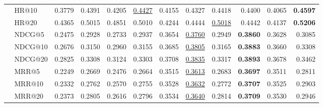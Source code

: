 \begin{tabular}{llrrrrrrrrrr}
 & HR@10 & 0.3779 & 0.4391 & 0.4205 & \underline{0.4427} & 0.4155 & 0.4327 & 0.4418 & 0.4400 & 0.4065 & \textbf{0.4597} \\
 & HR@20 & 0.4365 & 0.5015 & 0.4851 & 0.5010 & 0.4244 & 0.4444 & \underline{0.5018} & 0.4442 & 0.4137 & \textbf{0.5206} \\
 & NDCG@5 & 0.2475 & 0.2928 & 0.2733 & 0.2937 & 0.3654 & \underline{0.3760} & 0.2949 & \textbf{0.3860} & 0.3628 & 0.3085 \\
 & NDCG@10 & 0.2676 & 0.3150 & 0.2960 & 0.3155 & 0.3685 & \underline{0.3805} & 0.3165 & \textbf{0.3883} & 0.3660 & 0.3308 \\
 & NDCG@20 & 0.2825 & 0.3308 & 0.3124 & 0.3303 & 0.3708 & \underline{0.3835} & 0.3317 & \textbf{0.3893} & 0.3678 & 0.3462 \\
 & MRR@5 & 0.2249 & 0.2669 & 0.2476 & 0.2664 & 0.3515 & \underline{0.3613} & 0.2683 & \textbf{0.3697} & 0.3511 & 0.2811 \\
 & MRR@10 & 0.2332 & 0.2762 & 0.2570 & 0.2755 & 0.3528 & \underline{0.3632} & 0.2772 & \textbf{0.3707} & 0.3525 & 0.2903 \\
 & MRR@20 & 0.2373 & 0.2805 & 0.2616 & 0.2796 & 0.3534 & \underline{0.3640} & 0.2814 & \textbf{0.3709} & 0.3530 & 0.2946 \\
\hline
\end{tabular}
